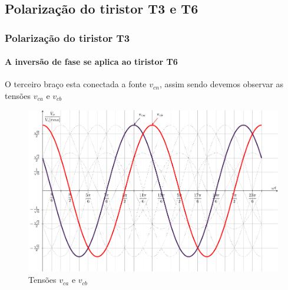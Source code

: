 \documentclass[aspectratio=43]{beamer}
\begin{document}
\subsection{Polarização do tiristor T3 e T6}
\begin{frame}
	\frametitle{Polarização do tiristor T3}
	\framesubtitle{A inversão de fase se aplica ao tiristor T6}
	
O terceiro braço esta conectada a fonte $v_{cn}$, assim sendo devemos observar as tensões $v_{ca}$ e $v_{cb}$
\begin{figure}
	\centering
	\includegraphics[width=0.6\linewidth]{figuras/SenosDrawSEQnT3T6}
	\caption{Tensões  $v_{ca}$ e $v_{cb}$}
	\label{fig:SenosDrawSEQnT3T6}
\end{figure}

\end{frame}
\end{document}
